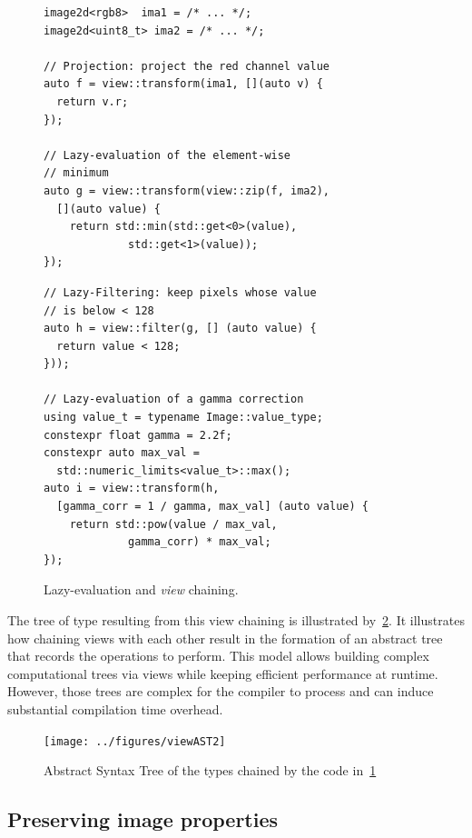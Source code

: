 \begin{figure}[htbp]
  \begin{minipage}[l]{0.48\linewidth}
    \begin{verbatim}
image2d<rgb8>  ima1 = /* ... */;
image2d<uint8_t> ima2 = /* ... */;

// Projection: project the red channel value
auto f = view::transform(ima1, [](auto v) {
  return v.r;
});

// Lazy-evaluation of the element-wise
// minimum
auto g = view::transform(view::zip(f, ima2),
  [](auto value) {
    return std::min(std::get<0>(value),
             std::get<1>(value));
});
\end{verbatim}
  \end{minipage}
  \hfill
  \begin{minipage}[l]{0.48\linewidth}
    \begin{verbatim}
// Lazy-Filtering: keep pixels whose value
// is below < 128
auto h = view::filter(g, [] (auto value) {
  return value < 128;
}));

// Lazy-evaluation of a gamma correction
using value_t = typename Image::value_type;
constexpr float gamma = 2.2f;
constexpr auto max_val =
  std::numeric_limits<value_t>::max();
auto i = view::transform(h,
  [gamma_corr = 1 / gamma, max_val] (auto value) {
    return std::pow(value / max_val,
             gamma_corr) * max_val;
});
\end{verbatim}
  \end{minipage}

  \caption{Lazy-evaluation and \emph{view} chaining.}
  \label{fig:lazy}
\end{figure}

The tree of type resulting from this view chaining is illustrated by~\cref{fig:viewAST}. It illustrates how chaining
views with each other result in the formation of an abstract tree that records the operations to perform. This model
allows building complex computational trees via views while keeping efficient performance at runtime. However, those
trees are complex for the compiler to process and can induce substantial compilation time overhead.

\begin{figure}[htb]
  \centering
  \texttt{[image: ../figures/viewAST2]}
  \caption{Abstract Syntax Tree of the types chained by the code in~\cref{fig:lazy}}
  \label{fig:viewAST}
\end{figure}


\subsection{Preserving image properties}

